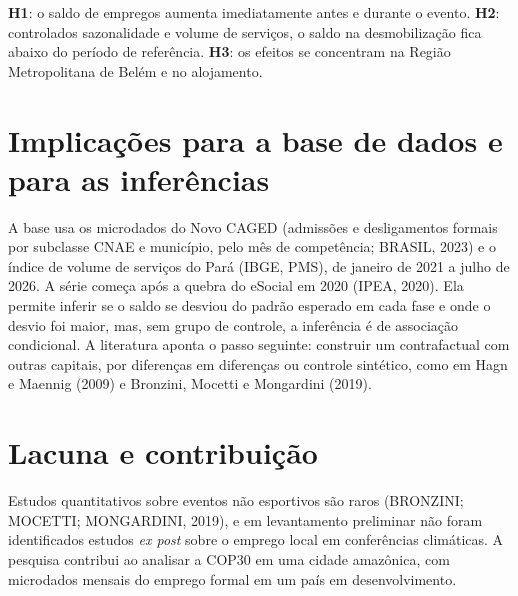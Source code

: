 \documentclass[12pt,a4paper]{article}
\begin{document}
\textbf{H1}: o saldo de empregos aumenta imediatamente antes e durante o
evento. \textbf{H2}: controlados sazonalidade e volume de serviços, o saldo na
desmobilização fica abaixo do período de referência. \textbf{H3}: os efeitos se
concentram na Região Metropolitana de Belém e no alojamento.

\section{Implicações para a base de dados e para as inferências}

A base usa os microdados do Novo CAGED (admissões e desligamentos formais por
subclasse CNAE e município, pelo mês de competência; BRASIL, 2023) e o índice
de volume de serviços do Pará (IBGE, PMS), de janeiro de 2021 a julho de 2026.
A série começa após a quebra do eSocial em 2020 (IPEA, 2020). Ela permite
inferir se o saldo se desviou do padrão esperado em cada fase e onde o desvio
foi maior, mas, sem grupo de controle, a inferência é de associação
condicional. A literatura aponta o passo seguinte: construir um contrafactual
com outras capitais, por diferenças em diferenças ou controle sintético, como
em Hagn e Maennig (2009) e Bronzini, Mocetti e Mongardini (2019).

\section{Lacuna e contribuição}

Estudos quantitativos sobre eventos não esportivos são raros (BRONZINI;
MOCETTI; MONGARDINI, 2019), e em levantamento preliminar não foram
identificados estudos \textit{ex post} sobre o emprego local em conferências
climáticas. A pesquisa contribui ao analisar a COP30 em uma cidade amazônica,
com microdados mensais do emprego formal em um país em desenvolvimento.
\end{document}

